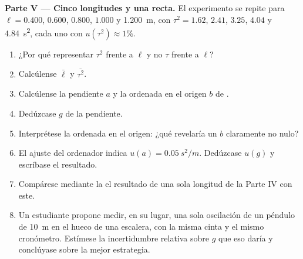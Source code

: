 \begin{problem}
\medskip
\noindent\textbf{Parte V --- Cinco longitudes y una recta.}
El experimento se repite para $\ell = 0.400$, $0.600$, $0.800$,
$1.000$ y \qty{1.200}{m}, con $\tau^2 = 1.62$, $2.41$, $3.25$,
$4.04$ y \qty{4.84}{s^2}, cada uno con $u(\tau^2) \approx 1\%$.
\begin{enumerate}[resume]
  \item ¿Por qué representar $\tau^2$ frente a $\ell$ y no $\tau$ frente
        a $\ell$?
  \item Calcúlense $\bar\ell$ y $\overline{\tau^2}$.
  \item Calcúlense la pendiente $a$ y la ordenada en el origen $b$ de
        .
  \item Dedúzcase $g$ de la pendiente.
  \item Interprétese la ordenada en el origen: ¿qué revelaría un $b$
        claramente no nulo?
  \item El ajuste del ordenador indica $u(a) = \qty{0.05}{s^2/m}$.
        Dedúzcase $u(g)$ y escríbase el resultado.
  \item Compárese mediante la  el resultado de una
        sola longitud de la Parte IV con este.
  \item Un estudiante propone medir, en su lugar, una sola oscilación de
        un péndulo de \qty{10}{m} en el hueco de una escalera, con la
        misma cinta y el mismo cronómetro. Estímese la incertidumbre
        relativa sobre $g$ que eso daría y conclúyase sobre la mejor
        estrategia.
\end{enumerate}
\end{problem}
